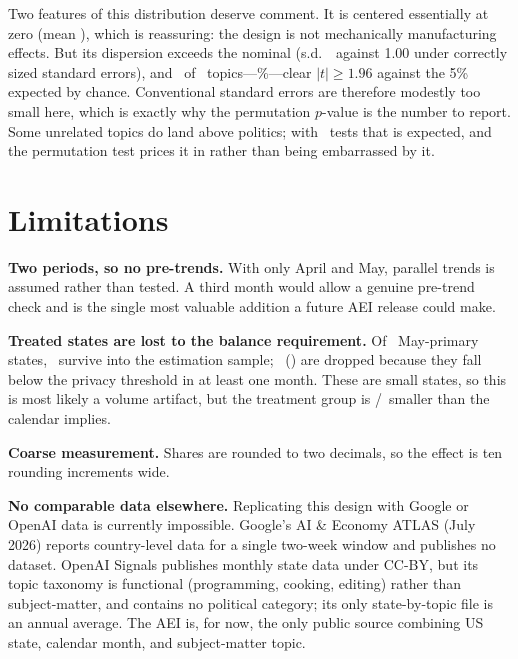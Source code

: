 \documentclass[11pt]{article}
\begin{document}
\noindent Two features of this distribution deserve comment. It is centered
essentially at zero (mean \nullMean), which is reassuring: the design is not
mechanically manufacturing effects. But its dispersion exceeds the nominal
(s.d.\ \nullSD\ against 1.00 under correctly sized standard errors), and
\nSig\ of \nullN\ topics---\pctSig\%---clear $|t| \geq 1.96$ against the 5\%
expected by chance. Conventional standard errors are therefore modestly too
small here, which is exactly why the permutation $p$-value is the number to
report. Some unrelated topics do land above politics; with \nullN\ tests that
is expected, and the permutation test prices it in rather than being
embarrassed by it.

\section{Limitations}

\textbf{Two periods, so no pre-trends.} With only April and May, parallel trends
is assumed rather than tested. A third month would allow a genuine pre-trend
check and is the single most valuable addition a future AEI release could make.

\textbf{Treated states are lost to the balance requirement.} Of \nMayPrimary\
May-primary states, \nMayKept\ survive into the estimation sample; \nMayDropped\
(\mayDroppedList) are dropped because they fall below the privacy threshold in
at least one month. These are small states, so this is most likely a volume
artifact, but the treatment group is \nMayDropped/\nMayPrimary\ smaller than the
calendar implies.

\textbf{Coarse measurement.} Shares are rounded to two decimals, so the effect
is ten rounding increments wide.

\textbf{No comparable data elsewhere.} Replicating this design with Google or
OpenAI data is currently impossible. Google's AI \& Economy ATLAS (July 2026)
reports country-level data for a single two-week window and publishes no
dataset. OpenAI Signals publishes monthly state data under CC-BY, but its topic
taxonomy is functional (programming, cooking, editing) rather than
subject-matter, and contains no political category; its only state-by-topic file
is an annual average. The AEI is, for now, the only public source combining US
state, calendar month, and subject-matter topic.
\end{document}
